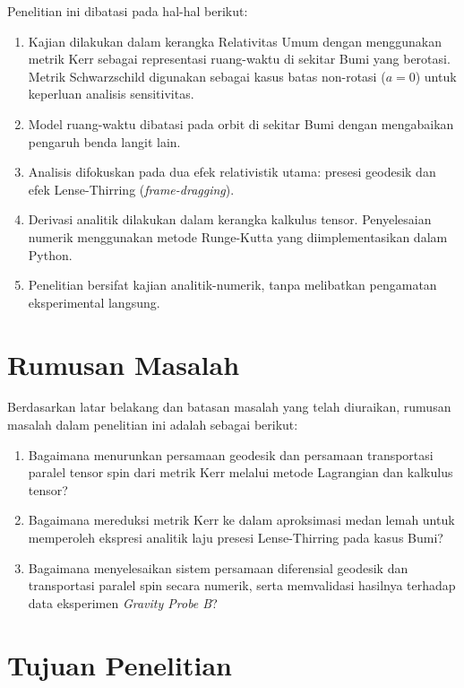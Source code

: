 Penelitian ini dibatasi pada hal-hal berikut:
\begin{enumerate}[label=\arabic*)]
    \item Kajian dilakukan dalam kerangka Relativitas Umum dengan menggunakan metrik Kerr sebagai representasi ruang-waktu di sekitar Bumi yang berotasi. Metrik Schwarzschild digunakan sebagai kasus batas non-rotasi ($a = 0$) untuk keperluan analisis sensitivitas.
    \item Model ruang-waktu dibatasi pada orbit di sekitar Bumi dengan mengabaikan pengaruh benda langit lain.
    \item Analisis difokuskan pada dua efek relativistik utama: presesi geodesik dan efek Lense-Thirring (\textit{frame-dragging}).
    \item Derivasi analitik dilakukan dalam kerangka kalkulus tensor. Penyelesaian numerik menggunakan metode Runge-Kutta yang diimplementasikan dalam Python.
    \item Penelitian bersifat kajian analitik-numerik, tanpa melibatkan pengamatan eksperimental langsung.
\end{enumerate}

\section{Rumusan Masalah}
\label{sec:rumusan-masalah}

Berdasarkan latar belakang dan batasan masalah yang telah diuraikan, rumusan masalah dalam penelitian ini adalah sebagai berikut:
\begin{enumerate}[label=\arabic*)]
    \item Bagaimana menurunkan persamaan geodesik dan persamaan transportasi paralel tensor spin dari metrik Kerr melalui metode Lagrangian dan kalkulus tensor?
    \item Bagaimana mereduksi metrik Kerr ke dalam aproksimasi medan lemah untuk memperoleh ekspresi analitik laju presesi Lense-Thirring pada kasus Bumi?
    \item Bagaimana menyelesaikan sistem persamaan diferensial geodesik dan transportasi paralel spin secara numerik, serta memvalidasi hasilnya terhadap data eksperimen \textit{Gravity Probe B}?
\end{enumerate}

\section{Tujuan Penelitian}
\label{sec:tujuan-penelitian}

